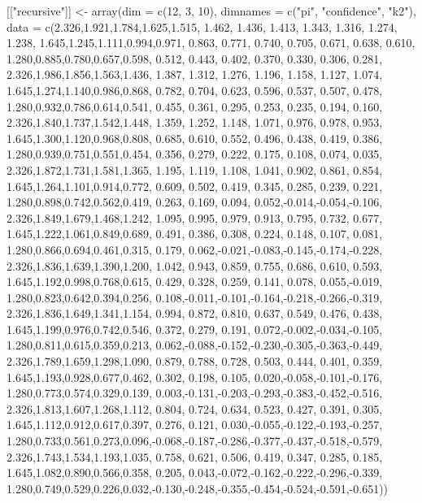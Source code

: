 \documentclass[10pt]{article}%
\begin{document}
[["recursive"]] <- array(dim = c(12, 3, 10), dimnames = c("pi", "confidence", "k2"), 
  data =
  c(2.326,1.921,1.784,1.625,1.515, 1.462, 1.436, 1.413, 1.343, 1.316, 1.274, 1.238,
    1.645,1.245,1.111,0.994,0.971, 0.863, 0.771, 0.740, 0.705, 0.671, 0.638, 0.610,
    1.280,0.885,0.780,0.657,0.598, 0.512, 0.443, 0.402, 0.370, 0.330, 0.306, 0.281,
    2.326,1.986,1.856,1.563,1.436, 1.387, 1.312, 1.276, 1.196, 1.158, 1.127, 1.074,
    1.645,1.274,1.140,0.986,0.868, 0.782, 0.704, 0.623, 0.596, 0.537, 0.507, 0.478,
    1.280,0.932,0.786,0.614,0.541, 0.455, 0.361, 0.295, 0.253, 0.235, 0.194, 0.160,
    2.326,1.840,1.737,1.542,1.448, 1.359, 1.252, 1.148, 1.071, 0.976, 0.978, 0.953,
    1.645,1.300,1.120,0.968,0.808, 0.685, 0.610, 0.552, 0.496, 0.438, 0.419, 0.386,
    1.280,0.939,0.751,0.551,0.454, 0.356, 0.279, 0.222, 0.175, 0.108, 0.074, 0.035,
    2.326,1.872,1.731,1.581,1.365, 1.195, 1.119, 1.108, 1.041, 0.902, 0.861, 0.854,
    1.645,1.264,1.101,0.914,0.772, 0.609, 0.502, 0.419, 0.345, 0.285, 0.239, 0.221,
    1.280,0.898,0.742,0.562,0.419, 0.263, 0.169, 0.094, 0.052,-0.014,-0.054,-0.106,
    2.326,1.849,1.679,1.468,1.242, 1.095, 0.995, 0.979, 0.913, 0.795, 0.732, 0.677,
    1.645,1.222,1.061,0.849,0.689, 0.491, 0.386, 0.308, 0.224, 0.148, 0.107, 0.081,
    1.280,0.866,0.694,0.461,0.315, 0.179, 0.062,-0.021,-0.083,-0.145,-0.174,-0.228,
    2.326,1.836,1.639,1.390,1.200, 1.042, 0.943, 0.859, 0.755, 0.686, 0.610, 0.593,
    1.645,1.192,0.998,0.768,0.615, 0.429, 0.328, 0.259, 0.141, 0.078, 0.055,-0.019,
    1.280,0.823,0.642,0.394,0.256, 0.108,-0.011,-0.101,-0.164,-0.218,-0.266,-0.319,
    2.326,1.836,1.649,1.341,1.154, 0.994, 0.872, 0.810, 0.637, 0.549, 0.476, 0.438,
    1.645,1.199,0.976,0.742,0.546, 0.372, 0.279, 0.191, 0.072,-0.002,-0.034,-0.105,
    1.280,0.811,0.615,0.359,0.213, 0.062,-0.088,-0.152,-0.230,-0.305,-0.363,-0.449,
    2.326,1.789,1.659,1.298,1.090, 0.879, 0.788, 0.728, 0.503, 0.444, 0.401, 0.359,
    1.645,1.193,0.928,0.677,0.462, 0.302, 0.198, 0.105, 0.020,-0.058,-0.101,-0.176,
    1.280,0.773,0.574,0.329,0.139, 0.003,-0.131,-0.203,-0.293,-0.383,-0.452,-0.516,
    2.326,1.813,1.607,1.268,1.112, 0.804, 0.724, 0.634, 0.523, 0.427, 0.391, 0.305,
    1.645,1.112,0.912,0.617,0.397, 0.276, 0.121, 0.030,-0.055,-0.122,-0.193,-0.257,
    1.280,0.733,0.561,0.273,0.096,-0.068,-0.187,-0.286,-0.377,-0.437,-0.518,-0.579,
    2.326,1.743,1.534,1.193,1.035, 0.758, 0.621, 0.506, 0.419, 0.347, 0.285, 0.185,
    1.645,1.082,0.890,0.566,0.358, 0.205, 0.043,-0.072,-0.162,-0.222,-0.296,-0.339,
    1.280,0.749,0.529,0.226,0.032,-0.130,-0.248,-0.355,-0.454,-0.524,-0.591,-0.651))
\end{document}
